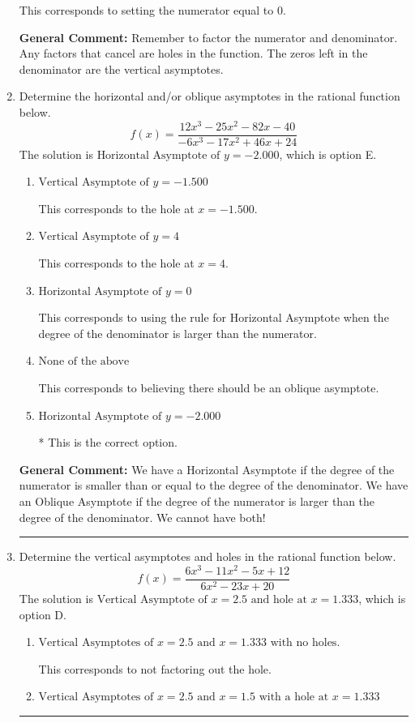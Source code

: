 \documentclass{extbook}[14pt]
\newcommand{\litem}[1]{\item #1

\rule{\textwidth}{0.4pt}}
\begin{document}
\begin{enumerate}
{\begin{enumerate}[label=\Alph*.]
This corresponds to setting the numerator equal to 0.
\end{enumerate}

\textbf{General Comment:} Remember to factor the numerator and denominator. Any factors that cancel are holes in the function. The zeros left in the denominator are the vertical asymptotes.
}
\litem{
Determine the horizontal and/or oblique asymptotes in the rational function below.
\[ f(x) = \frac{12x^{3} -25 x^{2} -82 x -40}{-6x^{3} -17 x^{2} +46 x + 24} \]The solution is \( \text{Horizontal Asymptote of } y = -2.000  \), which is option E.\begin{enumerate}[label=\Alph*.]
\item \( \text{Vertical Asymptote of } y = -1.500  \)

This corresponds to the hole at $x = -1.500$.
\item \( \text{Vertical Asymptote of } y = 4  \)

This corresponds to the hole at $x = 4$.
\item \( \text{Horizontal Asymptote of } y = 0  \)

This corresponds to using the rule for Horizontal Asymptote when the degree of the denominator is larger than the numerator.
\item \( \text{None of the above} \)

This corresponds to believing there should be an oblique asymptote.
\item \( \text{Horizontal Asymptote of } y = -2.000  \)

* This is the correct option.
\end{enumerate}

\textbf{General Comment:} We have a Horizontal Asymptote if the degree of the numerator is smaller than or equal to the degree of the denominator. We have an Oblique Asymptote if the degree of the numerator is larger than the degree of the denominator. We cannot have both!
}
\litem{
Determine the vertical asymptotes and holes in the rational function below.
\[ f(x) = \frac{6x^{3} -11 x^{2} -5 x + 12}{6x^{2} -23 x + 20} \]The solution is \( \text{Vertical Asymptote of } x = 2.5 \text{ and hole at } x = 1.333 \), which is option D.\begin{enumerate}[label=\Alph*.]
\item \( \text{Vertical Asymptotes of } x = 2.5 \text{ and } x = 1.333 \text{ with no holes.} \)

This corresponds to not factoring out the hole.
\item \( \text{Vertical Asymptotes of } x = 2.5 \text{ and } x = 1.5 \text{ with a hole at } x = 1.333 \)


\end{enumerate}}
\end{enumerate}
\end{document}
